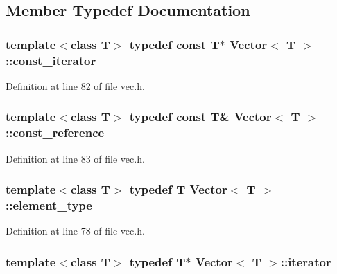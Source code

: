 \subsection{Member Typedef Documentation}
\hypertarget{class_vector_acbec6290edaeacd3b3b72f39bf910365}{
\subsubsection[{const\+\_\+iterator}]{\setlength{\rightskip}{0pt plus 5cm}template$<$class T$>$ typedef const T$\ast$ {\bf Vector}$<$ T $>$\+::{\bf const\+\_\+iterator}}}\label{class_vector_acbec6290edaeacd3b3b72f39bf910365}


Definition at line 82 of file vec.\+h.

\hypertarget{class_vector_a44d455da2c2c75f0ffda9856aa52308d}{
\subsubsection[{const\+\_\+reference}]{\setlength{\rightskip}{0pt plus 5cm}template$<$class T$>$ typedef const T\& {\bf Vector}$<$ T $>$\+::{\bf const\+\_\+reference}}}\label{class_vector_a44d455da2c2c75f0ffda9856aa52308d}


Definition at line 83 of file vec.\+h.

\hypertarget{class_vector_a89d40fb2fabe6e0576ad9de72e829df1}{
\subsubsection[{element\+\_\+type}]{\setlength{\rightskip}{0pt plus 5cm}template$<$class T$>$ typedef T {\bf Vector}$<$ T $>$\+::{\bf element\+\_\+type}}}\label{class_vector_a89d40fb2fabe6e0576ad9de72e829df1}


Definition at line 78 of file vec.\+h.

\hypertarget{class_vector_a30c203480dfd28a0f1fde5c08a68db94}{
\subsubsection[{iterator}]{\setlength{\rightskip}{0pt plus 5cm}template$<$class T$>$ typedef T$\ast$ {\bf Vector}$<$ T $>$\+::{\bf iterator}}}\label{class_vector_a30c203480dfd28a0f1fde5c08a68db94}


